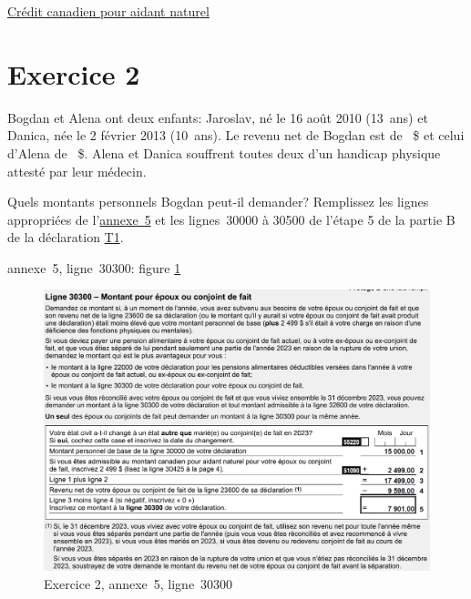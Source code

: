 \cat\href{https://www.canada.ca/fr/agence-revenu/services/impot/particuliers/sujets/tout-votre-declaration-revenus/declaration-revenus/remplir-declaration-revenus/deductions-credits-depenses/montant-aidants-naturels.html}{Crédit canadien pour aidant naturel}



\section{Exercice 2}
\setcounter{question}{0}
\begin{question}
	Bogdan et Alena ont deux enfants: Jaroslav, né le 16 août 2010 (13~ans) et Danica, née le 2 février 2013 (10~ans). Le revenu net de Bogdan est de ~\$ et celui d'Alena de ~\$. Alena et Danica souffrent toutes deux d'un handicap physique attesté par leur médecin.
	
	Quels montants personnels Bogdan peut-il demander? Remplissez les lignes appropriées de l'\href{https://www.canada.ca/fr/agence-revenu/services/formulaires-publications/trousses-impot-toutes-annees-imposition/trousse-generale-impot-prestations/5000-s5.html}{annexe~5} et les lignes~30000 à 30500 de l'étape 5 de la partie B de la déclaration \href{https://www.canada.ca/fr/agence-revenu/services/formulaires-publications/trousses-impot-toutes-annees-imposition/trousse-generale-impot-prestations/quebec/5005-r.html}{T1}.
\end{question}
annexe~5, ligne~30300: figure \ref{fig:chap4Exercice2Q130300}
\begin{figure}
	\centering
	\includegraphics[width=.9\textwidth]{exercice/4-2/Q1/30300.png}
	\caption{Exercice 2, annexe~5, ligne~30300}
	\label{fig:chap4Exercice2Q130300}
\end{figure}

